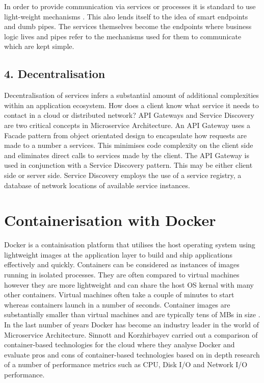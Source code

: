 \documentclass[journal]{IEEEtran}
\begin{document}
In order to provide communication via services or processes it is standard to use light-weight mechanisms \cite{MicroservicesYesterdayTodayTomorrow}. This also lends itself to the idea of smart endpoints and dumb pipes\cite{MicroservicesResourceGuide}. The services themselves become the endpoints where business logic lives and pipes refer to the mechanisms used for them to communicate which are kept simple.

\subsection*{ 4. Decentralisation }
Decentralisation of services infers a substantial amount of additional complexities within an application ecosystem. How does a client know what service it needs to contact in a cloud or distributed network? API Gateways\cite{APIGateways} and Service Discovery\cite{ServiceDiscovery} are two critical concepts in Microservice Architecture. An API Gateway uses a Facade pattern\cite{Gamma:1995:DPE:186897} from object orientated design to encapsulate how requests are made to a number a services. This minimises code complexity on the client side and eliminates direct calls to services made by the client. The API Gateway is used in conjunction with a Service Discovery pattern. This may be either client side or server side. Service Discovery employs the use of a service registry, a database of network locations of available service instances\cite{ServiceDiscovery}.


\section{Containerisation with Docker}
Docker \cite{Docker} is a containisation platform that utilises the host operating system using lightweight images at the application layer to build and ship applications effectively and quickly. Containers can be considered as instances of images  running in isolated processes. They are often compared to virtual machines however they are more lightweight and can share the host OS kernal with many other containers. Virtual machines often take a couple of minutes to start whereas containers launch in a number of seconds. Container images are substantially smaller than virtual machines and are typically tens of MBs in size \cite{Docker}. In the last number of years Docker has become an industry leader in the world of Microservice Architecture. Sinnott and Korzhirbayev carried out a comparison of container-based technologies for the cloud\cite{KOZHIRBAYEV2017175} where they analyse Docker and evaluate pros and cons of container-based technologies based on in depth research of a number of performance metrics such as CPU, Disk I/O and Network I/O performance.
\end{document}

